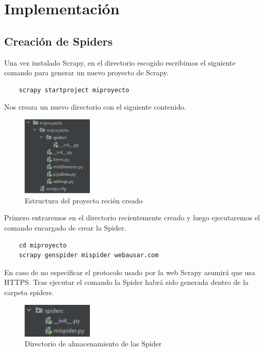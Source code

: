\chapter[Implementación]{Implementación}
\label{Chap5}

\section{Creación de Spiders}
Una vez instalado Scrapy, en el directorio escogido escribimos el siguiente comando para generar un nuevo proyecto de Scrapy.

\begin{verbatim}
	scrapy startproject miproyecto
\end{verbatim}

Nos creara un nuevo directorio con el siguiente contenido.

\begin{figure} [h!]
	\centering
	\includegraphics[width=0.3\textwidth]{fig/estructura_proyecto_scrapy.png}
	\caption[Estructura del proyecto recién creado]{Estructura del proyecto recién creado}
	\label{fig:ej11}
\end{figure}

Primero entraremos en el directorio recientemente creado y luego ejecutaremos el comando encargado de crear la Spider.

\begin{verbatim}
	cd miproyecto
	scrapy genspider mispider webausar.com
\end{verbatim}

En caso de no especificar el protocolo usado por la web Scrapy asumirá que usa HTTPS.\newline
\newline
Tras ejecutar el comando la Spider habrá sido generada dentro de la carpeta spiders.

\begin{figure} [h!]
	\centering
	\includegraphics[width=0.3\textwidth]{fig/primera_spider.png}
	\caption[Directorio de almacenamiento de las Spider]{Directorio de almacenamiento de las Spider}
	\label{fig:ej12}
\end{figure}

